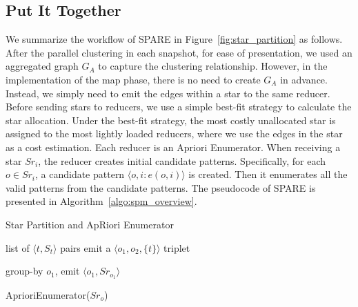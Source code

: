 \subsection{Put It Together}
We summarize the workflow of SPARE in Figure~\ref{fig:star_partition} as follows. After the parallel clustering in each snapshot, for ease of presentation, we used an aggregated graph $G_A$ to capture the clustering relationship. However, in the implementation of the map phase, there is no need to create $G_A$ in advance. Instead, we simply need to emit the edges within a star to the same reducer. Before sending stars to reducers, we use a simple best-fit strategy to calculate the star allocation. Under the best-fit strategy, the most costly unallocated star is assigned to the most lightly loaded reducers, where we use the edges in the star as a cost estimation.
 Each reducer is an Apriori Enumerator. When receiving a star $Sr_i$, the reducer creates initial candidate patterns. Specifically, for each $o \in Sr_i$, a candidate pattern $\langle o,i: e(o,i) \rangle$ is created. Then it enumerates all the valid patterns from the candidate patterns. The pseudocode of SPARE is presented in Algorithm~\ref{algo:spm_overview}. 

\begin{algorithm}
\small
\caption{Star Partition and ApRiori Enumerator}
\label{algo:spm_overview}
\begin{algorithmic}[1]
\Require list of $\langle t, S_t \rangle$ pairs
\label{code:spm-map-start}
	\State emit a $\langle o_1, o_2, \{t\}\rangle$ triplet~\label{code:spm-edge-direct}
	\EndFor
\EndFor
\label{code:spm-map-end}

\label{code:spm-shuffle-start}
	\State group-by $o_1$, emit $\langle o_1, Sr_{o_1} \rangle$ 
\EndFor
\label{code:spm-shuffle-end}

\label{code:spm-reduce-start}
\State AprioriEnumerator($Sr_o$)
\EndFor
\label{code:spm-reduce-end}

\end{algorithmic}
\end{algorithm}

